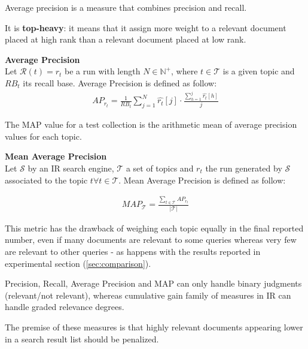Average precision is a measure that combines precision and recall.

It is \textbf{top-heavy}: it means that it assign more weight to a relevant document placed at high rank than a relevant document placed at low rank.

\begin{definition}{\textbf{Average Precision}}\\

Let $\mathcal{R}(t)=r_t$ be a run with length $N \in \mathbb{N}^+$, where $t \in \mathcal{T}$ is a given topic and $RB_t$ its recall base. Average Precision is defined as follow:
\begin{align*}
AP_{r_t} = \frac{1}{RB_t} \sum_{j = 1}^N \hat{r_t}[j] \cdot \frac{\sum_{h = 1}^j \hat{r_t}[h]}{j}
\end{align*}

\end{definition}

The MAP value for a test collection is the arithmetic mean of average precision values for each topic.

\begin{definition}{\textbf{Mean Average Precision}}\\

Let $\mathcal{S}$ by an IR search engine, $\mathcal{T}$ a set of topics and $r_t$ the run generated by $\mathcal{S}$ associated to the topic $t \forall t \in \mathcal{T}$. Mean Average Precision is defined as follow:

\begin{align*}
MAP_{\mathcal{T}} = \frac{\sum_{t \in \mathcal{T}} AP_{r_t}}{|\mathcal{T}|}
\end{align*}

\end{definition}

This metric has the drawback of weighing each topic equally in the final reported number, even if many documents are relevant to some queries whereas very few are relevant to other queries - as happens with the results reported in experimental section (\ref{sec:comparison}).


Precision, Recall, Average Precision and MAP can only handle binary judgments (relevant/not relevant),
whereas  cumulative gain family of measures in IR can handle graded relevance degrees.

The premise of these measures is that highly relevant documents appearing lower in a search result list should be penalized.

